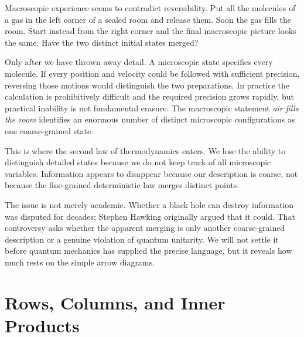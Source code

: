 Macroscopic experience seems to contradict reversibility. Put all the molecules of a gas in the left corner of a sealed room and release them. Soon the gas fills the room. Start instead from the right corner and the final macroscopic picture looks the same. Have the two distinct initial states merged?

Only after we have thrown away detail. A microscopic state specifies every molecule. If every position and velocity could be followed with sufficient precision, reversing those motions would distinguish the two preparations. In practice the calculation is prohibitively difficult and the required precision grows rapidly, but practical inability is not fundamental erasure. The macroscopic statement \emph{air fills the room} identifies an enormous number of distinct microscopic configurations as one coarse-grained state.

This is where the second law of thermodynamics enters. We lose the ability to distinguish detailed states because we do not keep track of all microscopic variables. Information appears to disappear because our description is coarse, not because the fine-grained deterministic law merges distinct points.

\begin{classroomqa}
\end{classroomqa}

The issue is not merely academic. Whether a black hole can destroy information was disputed for decades; Stephen Hawking originally argued that it could. That controversy asks whether the apparent merging is only another coarse-grained description or a genuine violation of quantum unitarity. We will not settle it before quantum mechanics has supplied the precise language, but it reveals how much rests on the simple arrow diagrams.

\section{Rows, Columns, and Inner Products}

